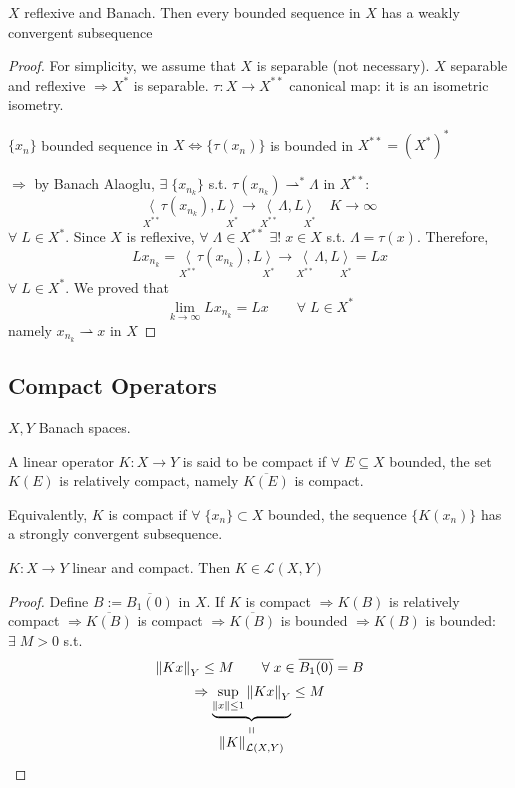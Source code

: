\begin{theorem}
    \(X\) reflexive and Banach. Then every bounded sequence in \(X\) has a weakly convergent subsequence
\end{theorem}

\begin{proof}
    For simplicity, we assume that \(X\) is separable (not necessary). \(X \) separable and reflexive \(\Rightarrow X^*\) is separable. \(\tau:X \to X^{**}\) canonical map: it is an isometric isometry.

    \(\{x_n\}\) bounded sequence in \(X \Leftrightarrow \{ \tau(x_n) \}\) is bounded in \(X^{**} = (X^*)^*\)
        
    \(\Rightarrow \) by Banach Alaoglu, \(\exists \; \{x_{n_k}\}\) s.t. \(\tau(x_{n_k})\rightharpoonup^* \Lambda \) in \(X^{**}\):
    \[
        \underset{X^{**}}{\langle}\tau(x_{n_k}), L \underset{X^*}{\rangle} \to \underset{X^{**}}{\langle}\Lambda, L \underset{X^*}{\rangle} \quad K \to \infty
    \]
    \(\forall\; L \in X^*.\) Since \(X\) is reflexive, \(\forall \; \Lambda \in X^{**} \) \(\exists ! \; x \in X\) s.t. \(\Lambda = \tau (x)\). Therefore, 
    \[
        L x_{n_k} = \underset{X^{**}}{\langle}\tau(x_{n_k}), L \underset{X^*}{\rangle} \to \underset{X^{**}}{\langle}\Lambda, L \underset{X^*}{\rangle} = Lx
    \]
    \(\forall\; L \in X^*\). We proved that 
    \[
        \lim_{k \to \infty} L x_{n_k} = Lx \qquad \forall\; L \in X^*
    \]
    namely \(x_{n_k} \rightharpoonup x\) in \(X\)
\end{proof}

\subsection*{Compact Operators}
\(X, Y\) Banach spaces. 
\begin{definition}
    A linear operator \(K:X \to Y\) is said to be compact if \(\forall \; E \subseteq X\) bounded, the set \(K(E)\) is relatively compact, namely \(\overline{K(E)}\) is compact. 

    Equivalently, \(K\) is compact if \(\forall \; \{x_n\} \subset X \) bounded, the sequence \(\{K(x_n)\}\) has a strongly convergent subsequence. 
\end{definition}
\begin{proposition}
    \(K:X \to Y\) linear and compact. Then \(K \in \mathcal{L}(X, Y)\)
\end{proposition}
\begin{proof}
    Define \(B:=\overline{B_1(0)}\) in \(X\). If \(K\) is compact 
    \(\Rightarrow K(B) \) is relatively compact 
    \(\Rightarrow \overline{K(B)}\) is compact 
    \(\Rightarrow \overline{K(B)}\) is bounded
    \(\Rightarrow K(B)\) is bounded: \(\exists \; M>0 \) s.t. 
    \[
        \norm{Kx}_Y \leq M \qquad \forall \; x \in \overline{B_1(0)} = B
    \]
    \[
        \Rightarrow \stackbelow{\underbrace{\sup_{\norm{x} \leq 1} \norm{Kx}_Y}}{\norm{K}_{\mathcal{L}(X, Y)}} \leq M
    \]
\end{proof}

